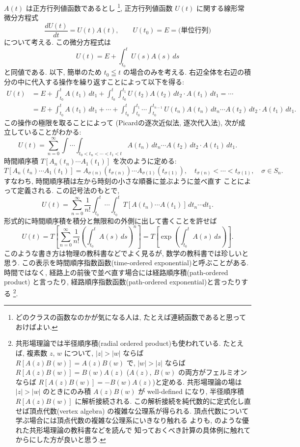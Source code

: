 \documentclass[12pt,twoside]{jarticle}
\theoremstyle{definition} %
\theoremstyle{definition} %
\theoremstyle{definition} %
\numberwithin{theorem}{section}
\numberwithin{equation}{section}
\numberwithin{figure}{section}
\numberwithin{table}{section}
\begin{document}
$A(t)$ は正方行列値函数であるとし%
\footnote{どのクラスの函数なのかが気になる人は,
たとえば連続函数であると思っておけばよい.},
正方行列値函数 $U(t)$ に関する線形常微分方程式
\[
 \frac{dU(t)}{dt} = U(t)A(t), \qquad U(t_0)=E=\text{(単位行列)}
\]
について考える. この微分方程式は
\[
 U(t) = E + \int_{t_0}^t U(s)A(s)\,ds
\]
と同値である. 以下, 簡単のため $t_0\leqq t$ の場合のみを考える.
右辺全体を右辺の積分の中に代入する操作を繰り返すことによって以下を得る:
\begin{align*}
U(t)
&
= E
+ \int_{t_0}^t A(t_1)\, dt_1
+ \int_{t_0}^t\int_{t_0}^{t_1} U(t_2)A(t_2)\,dt_2\cdot A(t_1)\,dt_1
= \cdots
\\ &
= E
+ \int_{t_0}^t A(t_1)\, dt_1
+ \cdots
+ \int_{t_0}^t\int_{t_0}^{t_1}\cdots\int_{t_0}^{t_{n-1}}
U(t_n)A(t_n)\,dt_n\cdots A(t_2)\,dt_2\cdot A(t_1)\,dt_1.
\end{align*}
この操作の極限を取ることによって
(Picardの逐次近似法, 逐次代入法),
次が成立していることがわかる:
\[
U(t)
= \sum_{n=0}^\infty
\int\!\cdots\!\int_{t_0<t_n<\cdots<t_1<t}
A(t_n)\,dt_n\cdots A(t_2)\,dt_2\cdot A(t_1)\,dt_1.
\]
時間順序積 $T[A_n(t_n)\cdots A_1(t_1)]$ を次のように定める:
\[
T[A_n(t_n)\cdots A_1(t_1)]
=A_{\sigma(n)}(t_{\sigma(n)})\cdots A_{\sigma(1)}(t_{\sigma(1)}), \quad
t_{\sigma(n)}<\cdots<t_{\sigma(1)}, \quad
\sigma\in S_n.
\]
すなわち, 時間順序積は左から時刻の小さな順番に並ぶように並べ直す
ことによって定義される. この記号法のもとで,
\[
U(t)=\sum_{n=0}^\infty
\frac{1}{n!}
\int_{t_0}^t\!\cdots\!\int_{t_0}^t T[A(t_n)\cdots A(t_1)]\,dt_n\cdots dt_1.
\]
形式的に時間順序積を積分と無限和の外側に出して書くことを許せば
\[
U(t)
= T\left[
\sum_{n=0}^\infty \frac{1}{n!} \left(\int_{t_0}^t A(s)\,ds\right)^n
\right]
= T\left[
\exp\left( \int_{t_0}^t A(s)\, ds \right)
\right].
\]
このような書き方は物理の教科書などでよく見るが,
数学の教科書では珍しいと思う.
この表示を時間順序指数函数(time-ordered exponential)と呼ぶことがある.
時間ではなく, 経路上の前後で並べ直す場合には経路順序積(path-ordered product)
と言ったり, 経路順序指数函数(path-ordered exponential)と言ったりする%
\footnote{共形場理論では半径順序積(radial ordered product)も使われている.
たとえば, 複素数 $z$, $w$ について,
$|z|>|w|$ ならば $R[A(z)B(w)]=A(z)B(w)$ で,
$|w|>|z|$ ならば $R[A(z)B(w)]=B(w)A(z)$
($A(z)$, $B(w)$ の両方がフェルミオンならば $R[A(z)B(w)]=-B(w)A(z)$)と定める.
共形場理論の場は $|z|>|w|$ のときにのみ積 $A(z)B(w)$ が
well-defined になり, 半径順序積 $R[A(z)B(w)]$ に解析接続される.
この解析接続を純代数的に定式化し直せば頂点代数(vertex algebra)
の複雑な公理系が得られる.
頂点代数について学ぶ場合には頂点代数の複雑な公理系にいきなり触れる
よりも, \cite{yamada} のような優れた共形場理論の教科書などを読んで
知っておくべき計算の具体例に触れてからにした方が良いと思う.
}.
\end{document}

